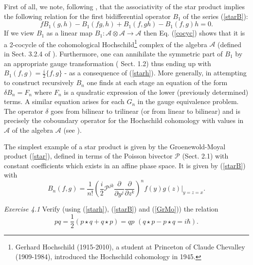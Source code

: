 \documentclass[12pt]{article}
\begin{document}
First of all, we note, following \cite{K}, that the associativity of the star product implies the following relation for 
the first bidifferential operator $B_1$ of the series (\ref{starB}):
\begin{equation}
\label{cocyc}
fB_1(g, h) - B_1(fg, h) + B_1(f, gh) - B_1(f, g)h = 0.
\end{equation}
If we view $B_1$ as a linear map $B_1:  {\mathcal A}\otimes{\mathcal A} \rightarrow {\mathcal A}$ then Eq. (\ref{cocyc}) shows that it is 
a 2-cocycle of the cohomological Hochschild\footnote{Gerhard Hochschild (1915-2010), a student at Princeton of Claude Chevalley (1909-1984),
introduced the Hochschild cohomology in 1945.} complex of the algebra ${\mathcal A}$ (defined in Sect. 3.2.4 of \cite{K}). Furthermore, one can 
annihilate the symmetric part of $B_1$ by an appropriate gauge transformation (\cite{K} Sect. 1.2) thus ending up with 
$B_1(f, g) = \frac{i}{2}\{f, g\}$ - as a consequence of (\ref{starh}). More generally, in attempting to construct recursively $B_n$ one finds 
at each stage an equation of the form $\delta B_n = F_n$ where $F_n$ is a quadratic expression of the lower (previously determined) terms. A 
similar equation arises for each $G_n$ in the gauge equivalence problem. The operator $\delta$ goes from bilinear to trilinear (or from linear 
to bilinear) and is precisely the coboundary operator for the Hochschild cohomology with values in ${\mathcal A}$ of the algebra ${\mathcal A}$
(see \cite{W94}).

The simplest example of a star product is given by the Groenewold-Moyal product (\ref{star}), defined in terms of the Poisson bivector ${\mathcal P}$
(Sect. 2.1) with constant coefficients which exists in an affine phase space. It is given by (\ref{starB}) with
\begin{equation}
\label{GrMo}
B_n(f, g) = \frac{1}{n!}(\frac{i}{2}{\mathcal P}^{jk}\frac{\partial}{\partial y^j}\frac{\partial}{\partial z^k})^n f(y) g(z)|_{y=z=x}. 
\end{equation}

{\it Exercise 4.1} Verify (using (\ref{starh}), (\ref{starB}) and (\ref{GrMo})) the relation
\begin{equation}
\label{Wpq}
pq = \frac{1}{2}(p\star q + q\star p) = qp \, \, (q\star p - p\star q = i\hbar).
\end{equation}
\end{document}

